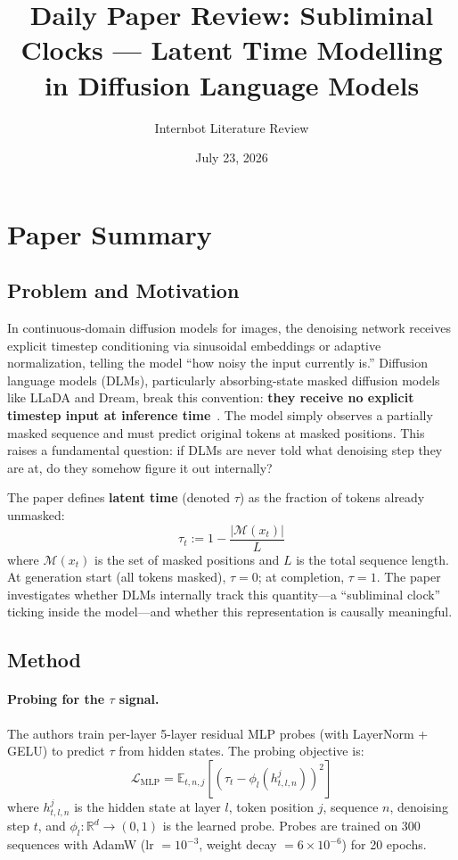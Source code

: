 \documentclass[11pt,a4paper]{article}
\title{Daily Paper Review: Subliminal Clocks --- Latent Time Modelling in Diffusion Language Models}
\author{Internbot Literature Review}
\date{July 23, 2026}
\begin{document}
\maketitle

\section{Paper Summary}

\subsection{Problem and Motivation}

In continuous-domain diffusion models for images, the denoising network receives explicit timestep conditioning via sinusoidal embeddings or adaptive normalization, telling the model ``how noisy the input currently is.'' Diffusion language models (DLMs), particularly absorbing-state masked diffusion models like LLaDA and Dream, break this convention: \textbf{they receive no explicit timestep input at inference time}~\cite{rulli2026subliminal}. The model simply observes a partially masked sequence and must predict original tokens at masked positions. This raises a fundamental question: if DLMs are never told what denoising step they are at, do they somehow figure it out internally?

The paper defines \textbf{latent time} (denoted $\tau$) as the fraction of tokens already unmasked:
\begin{equation}
    \tau_t := 1 - \frac{|\mathcal{M}(x_t)|}{L}
\end{equation}
where $\mathcal{M}(x_t)$ is the set of masked positions and $L$ is the total sequence length. At generation start (all tokens masked), $\tau = 0$; at completion, $\tau = 1$. The paper investigates whether DLMs internally track this quantity---a ``subliminal clock'' ticking inside the model---and whether this representation is causally meaningful.

\subsection{Method}

\paragraph{Probing for the $\tau$ signal.}
The authors train per-layer 5-layer residual MLP probes (with LayerNorm + GELU) to predict $\tau$ from hidden states. The probing objective is:
\begin{equation}
    \mathcal{L}_{\text{MLP}} = \mathbb{E}_{t,n,j}\left[(\tau_t - \phi_l(h_{t,l,n}^j))^2\right]
\end{equation}
where $h_{t,l,n}^j$ is the hidden state at layer $l$, token position $j$, sequence $n$, denoising step $t$, and $\phi_l: \mathbb{R}^d \to (0,1)$ is the learned probe. Probes are trained on 300 sequences with AdamW (lr $= 10^{-3}$, weight decay $= 6 \times 10^{-6}$) for 20 epochs.
\end{document}
